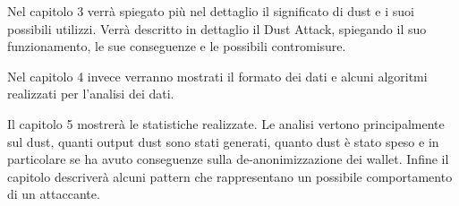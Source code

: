 Nel capitolo 3 verrà spiegato più nel dettaglio il significato di dust e i suoi possibili utilizzi. Verrà descritto in dettaglio il Dust Attack, spiegando il suo funzionamento, le sue conseguenze e le possibili contromisure.

Nel capitolo 4 invece verranno mostrati il formato dei dati e alcuni algoritmi realizzati per l'analisi dei dati.

Il capitolo 5 mostrerà le statistiche realizzate. Le analisi vertono principalmente sul dust, quanti output dust sono stati generati, quanto dust è stato speso e in particolare se ha avuto conseguenze sulla de-anonimizzazione dei wallet. Infine il capitolo descriverà alcuni pattern che rappresentano un possibile comportamento di un attaccante.